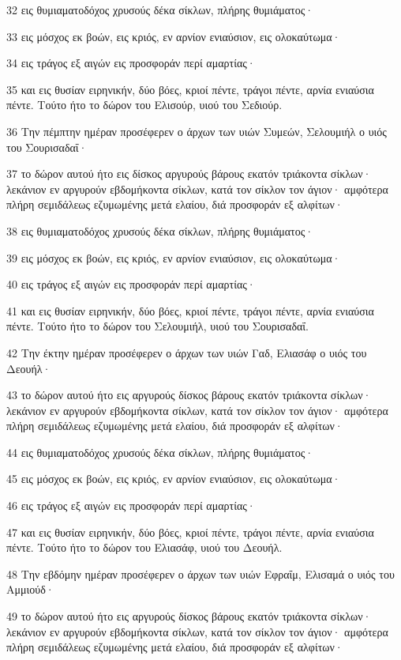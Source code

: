 \par 32 εις θυμιαματοδόχος χρυσούς δέκα σίκλων, πλήρης θυμιάματος·
\par 33 εις μόσχος εκ βοών, εις κριός, εν αρνίον ενιαύσιον, εις ολοκαύτωμα·
\par 34 εις τράγος εξ αιγών εις προσφοράν περί αμαρτίας·
\par 35 και εις θυσίαν ειρηνικήν, δύο βόες, κριοί πέντε, τράγοι πέντε, αρνία ενιαύσια πέντε. Τούτο ήτο το δώρον του Ελισούρ, υιού του Σεδιούρ.
\par 36 Την πέμπτην ημέραν προσέφερεν ο άρχων των υιών Συμεών, Σελουμιήλ ο υιός του Σουρισαδαΐ·
\par 37 το δώρον αυτού ήτο εις δίσκος αργυρούς βάρους εκατόν τριάκοντα σίκλων· λεκάνιον εν αργυρούν εβδομήκοντα σίκλων, κατά τον σίκλον τον άγιον· αμφότερα πλήρη σεμιδάλεως εζυμωμένης μετά ελαίου, διά προσφοράν εξ αλφίτων·
\par 38 εις θυμιαματοδόχος χρυσούς δέκα σίκλων, πλήρης θυμιάματος·
\par 39 εις μόσχος εκ βοών, εις κριός, εν αρνίον ενιαύσιον, εις ολοκαύτωμα·
\par 40 εις τράγος εξ αιγών εις προσφοράν περί αμαρτίας·
\par 41 και εις θυσίαν ειρηνικήν, δύο βόες, κριοί πέντε, τράγοι πέντε, αρνία ενιαύσια πέντε. Τούτο ήτο το δώρον του Σελουμιήλ, υιού του Σουρισαδαΐ.
\par 42 Την έκτην ημέραν προσέφερεν ο άρχων των υιών Γαδ, Ελιασάφ ο υιός του Δεουήλ·
\par 43 το δώρον αυτού ήτο εις αργυρούς δίσκος βάρους εκατόν τριάκοντα σίκλων· λεκάνιον εν αργυρούν εβδομήκοντα σίκλων, κατά τον σίκλον τον άγιον· αμφότερα πλήρη σεμιδάλεως εζυμωμένης μετά ελαίου, διά προσφοράν εξ αλφίτων·
\par 44 εις θυμιαματοδόχος χρυσούς δέκα σίκλων, πλήρης θυμιάματος·
\par 45 εις μόσχος εκ βοών, εις κριός, εν αρνίον ενιαύσιον, εις ολοκαύτωμα·
\par 46 εις τράγος εξ αιγών εις προσφοράν περί αμαρτίας·
\par 47 και εις θυσίαν ειρηνικήν, δύο βόες, κριοί πέντε, τράγοι πέντε, αρνία ενιαύσια πέντε. Τούτο ήτο το δώρον του Ελιασάφ, υιού του Δεουήλ.
\par 48 Την εβδόμην ημέραν προσέφερεν ο άρχων των υιών Εφραΐμ, Ελισαμά ο υιός του Αμμιούδ·
\par 49 το δώρον αυτού ήτο εις αργυρούς δίσκος βάρους εκατόν τριάκοντα σίκλων· λεκάνιον εν αργυρούν εβδομήκοντα σίκλων, κατά τον σίκλον τον άγιον· αμφότερα πλήρη σεμιδάλεως εζυμωμένης μετά ελαίου, διά προσφοράν εξ αλφίτων·
